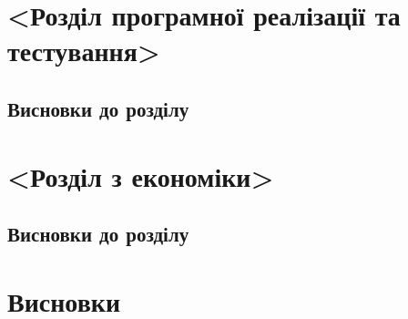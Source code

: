 \documentclass[14pt]{extreport}
\begin{document}
  \chapter{<Розділ програмної реалізації та тестування>}
  
  \section{}
  \section{Висновки до розділу}
  
  \chapter{<Розділ з економіки>}
  
  \section{}
  \section{Висновки до розділу}
  
  \chapter*{Висновки}
  
\end{document}
